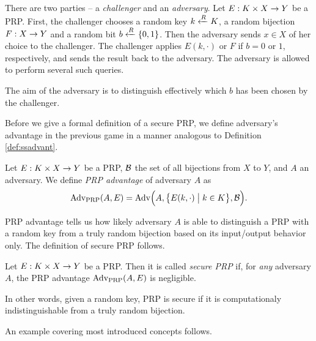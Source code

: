 \begin{game}
\label{game:prp}
	There are two parties -- a {\em challenger} and an {\em adversary}. Let $E:K\times X\rightarrow Y$ be a PRP. First, the challenger chooses a random key $k\xleftarrow{R} K$, a random bijection $F:X\rightarrow Y$ and a random bit $b\xleftarrow{R}\{0,1\}$. Then the adversary sends $x\in X$ of her choice to the challenger. The challenger applies $E(k,\cdot)$ or $F$ if $b=0$ or $1$, respectively, and sends the result back to the adversary. The adversary is allowed to perform several such queries.
	
	The aim of the adversary is to distinguish effectively which $b$ has been chosen by the challenger.
\end{game}

Before we give a formal definition of a secure PRP, we define adversary's advantage in the previous game in a manner analogous to Definition \ref{def:ssadvant}.

\begin{defn}
\label{def:prpadvant}
	Let $E: K\times X\rightarrow Y$ be a PRP, $\cal B$ the set of all bijections from $X$ to $Y$, and $A$ an adversary. We define {\em PRP advantage} of adversary $A$ as
	\[
		\operatorname*{Adv_{PRP}}(A,E) = \operatorname*{Adv}\Bigl(A,\bigl\{E(k,\cdot) \bigm| k\in K\bigr\},{\cal B}\Bigr) .
	\]
\end{defn}

PRP advantage tells us how likely adversary $A$ is able to distinguish a PRP with a random key from a truly random bijection based on its input/output behavior only. The definition of secure PRP follows.

\begin{defn}
\label{def:secprp}
	Let $E: K\times X\rightarrow Y$ be a PRP. Then it is called {\em secure PRP} if, for {\em any} adversary $A$, the PRP advantage $\operatorname*{Adv_{PRP}}(A,E)$ is negligible.
\end{defn}

In other words, given a random key, PRP is secure if it is computationaly indistinguishable from a truly random bijection. 

An example covering most introduced concepts follows.

